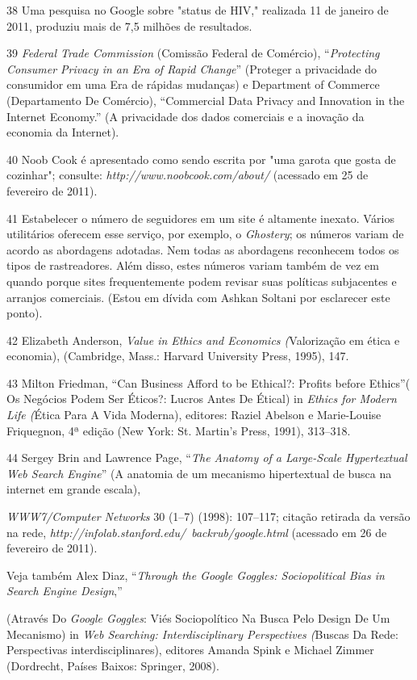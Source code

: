 38 Uma pesquisa no Google sobre "status de HIV," realizada 11 de janeiro
de 2011, produziu mais de 7,5 milhões de resultados.

39 \emph{Federal Trade Commission} (Comissão Federal de Comércio),
``\emph{Protecting Consumer Privacy in an Era of Rapid Change}''
(Proteger a privacidade do consumidor em uma Era de rápidas mudanças) e
Department of Commerce (Departamento De Comércio), ``Commercial Data
Privacy and Innovation in the Internet Economy.'' (A privacidade dos
dados comerciais e a inovação da economia da Internet).

40 Noob Cook é apresentado como sendo escrita por "uma garota que gosta
de cozinhar"; consulte:
\emph{http://www.noobcook.com/about/}
(acessado em 25 de fevereiro de 2011).

41 Estabelecer o número de seguidores em um site é altamente inexato.
Vários utilitários oferecem esse serviço, por exemplo, o
\emph{Ghostery}; os números variam de acordo as abordagens adotadas. Nem
todas as abordagens reconhecem todos os tipos de rastreadores. Além
disso, estes números variam também de vez em quando porque sites
frequentemente podem revisar suas políticas subjacentes e arranjos
comerciais. (Estou em dívida com Ashkan Soltani por esclarecer este
ponto).

42 Elizabeth Anderson, \emph{Value in Ethics and Economics (}Valorização
em ética e economia), (Cambridge, Mass.: Harvard University Press,
1995), 147.

43 Milton Friedman, ``Can Business Afford to be Ethical?: Profits before
Ethics''( Os Negócios Podem Ser Éticos?: Lucros Antes De Étical) in
\emph{Ethics for Modern Life (}Ética Para A Vida Moderna), editores:
Raziel Abelson e Marie-Louise Friquegnon, 4ª edição (New York: St.
Martin's Press, 1991), 313--318.

44 Sergey Brin and Lawrence Page, ``\emph{The Anatomy of a Large-Scale
Hypertextual Web Search Engine}'' (A anatomia de um mecanismo
hipertextual de busca na internet em grande escala),

\emph{WWW7/Computer Networks} 30 (1--7) (1998): 107--117; citação
retirada da versão na rede,
\emph{http://infolab.stanford.edu/~backrub/google.html}
(acessado em 26 de fevereiro de 2011).

Veja também Alex Diaz, ``\emph{Through} \emph{the Google Goggles:
Sociopolitical Bias in Search Engine Design},''

(Através Do \emph{Google Goggles}: Viés Sociopolítico Na Busca Pelo
Design De Um Mecanismo) in \emph{Web Searching: Interdisciplinary
Perspectives (}Buscas Da Rede: Perspectivas interdisciplinares),
editores Amanda Spink e Michael Zimmer (Dordrecht, Países Baixos:
Springer, 2008).

